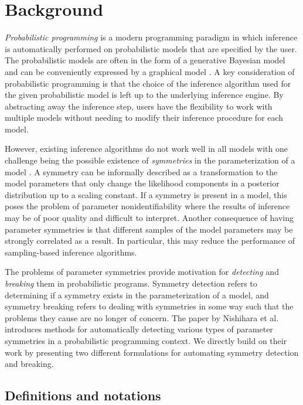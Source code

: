 

\section{Background}

\textit{Probabilistic programming} is a modern programming paradigm in which inference is automatically performed on probabilistic models that are specified by the user. The probabilistic models are often in the form of a generative Bayesian model and can be conveniently expressed by a graphical model \cite{Rainforth:2017}. A key consideration of probabilistic programming is that the choice of the inference algorithm used for the given probabilistic model is left up to the underlying inference engine. By abstracting away the inference step, users have the flexibility to work with multiple models without needing to modify their inference procedure for each model.

However, existing inference algorithms do not work well in all models with one challenge being the possible existence of \textit{symmetries} in the parameterization of a model \cite{Nishihara:2013}. A symmetry can be informally described as a transformation to the model parameters that only change the likelihood components in a posterior distribution up to a scaling constant. If a symmetry is present in a model, this poses the problem of parameter nonidentifiability where the results of inference may be of poor quality and difficult to interpret. Another consequence of having parameter symmetries is that different samples of the model parameters may be strongly correlated as a result. In particular, this may reduce the performance of sampling-based inference algorithms.

The problems of parameter symmetries provide motivation for \textit{detecting} and \textit{breaking} them in probabilistic programs. Symmetry detection refers to determining if a symmetry exists in the parameterization of a model, and symmetry breaking refers to dealing with symmetries in some way such that the problems they cause are no longer of concern. The paper by Nishihara et al. \cite{Nishihara:2013} introduces methods for automatically detecting various types of parameter symmetries in a probabilistic programming context. We directly build on their work by presenting two different formulations for automating symmetry detection and breaking.


\subsection{Definitions and notations}

